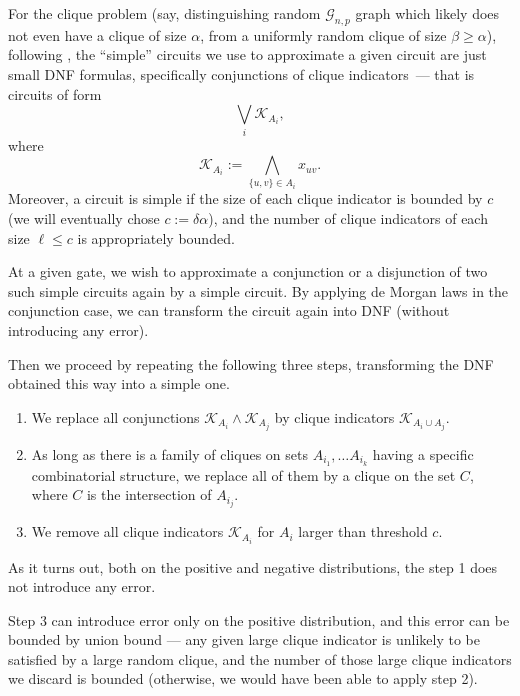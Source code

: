 For the clique problem (say, distinguishing random $\mathcal{G}_{n,p}$ graph which likely does not even have a clique of size $\alpha$, from a uniformly random clique of size $\beta \geq \alpha$), following \cite{razborov1985lower,alon87,cavalar2022}, the ``simple'' circuits we use to approximate a given circuit are just small DNF formulas, specifically conjunctions of clique indicators~--- that is circuits of form
\begin{equation*}
    \bigvee_i \mathcal{K}_{A_i},
\end{equation*}
where
\begin{equation*}
    \mathcal{K}_{A_i} := \bigwedge_{ \{u, v\} \in A_i} x_{uv}.
\end{equation*}
Moreover, a circuit is simple if the size of each clique indicator is bounded by $c$ (we will eventually chose $c := \delta \alpha$), and the number of clique indicators of each size $\ell \leq c$ is appropriately bounded.

At a given gate, we wish to approximate a conjunction or a disjunction of two such simple circuits again by a simple circuit. By applying de Morgan laws in the conjunction case, we can transform the circuit again into DNF (without introducing any error).

Then we proceed by repeating the following three steps, transforming the DNF obtained this way into a simple one.
\begin{enumerate}
    \item We replace all conjunctions $\mathcal{K}_{A_i} \land \mathcal{K}_{A_j}$ by clique indicators $\mathcal{K}_{A_i \cup A_j}$.
    \item As long as there is a family of cliques on sets $A_{i_1}, \ldots A_{i_k}$ having a specific combinatorial structure, we replace all of them by a clique on the set $C$, where $C$ is the intersection of $A_{i_j}$.
    \item We remove all clique indicators $\mathcal{K}_{A_i}$ for $A_i$ larger than threshold $c$.
\end{enumerate}

As it turns out, both on the positive and negative distributions, the step 1 does not introduce any error.

Step 3 can introduce error only on the positive distribution, and this error can be bounded by union bound --- any given large clique indicator is unlikely to be satisfied by a large random clique, and the number of those large clique indicators we discard is bounded (otherwise, we would have been able to apply step 2).

